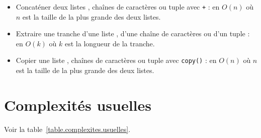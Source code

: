 \begin{itemize}
  \item[\textbullet] Concaténer deux listes \python, chaînes de caractères ou tuple avec \texttt{+} : en $O(n)$ où $n$ est la taille de la plus grande des deux listes.
  \item[\textbullet] Extraire une tranche d'une liste \python, d'une chaîne de caractères ou d'un tuple : en $O(k)$ où $k$ est la longueur de la tranche.
  \item[\textbullet] Copier une liste \python, chaînes de caractères ou tuple avec \texttt{copy()} : en $O(n)$ où $n$ est la taille de la plus grande des deux listes.
\end{itemize}

\section{Complexités usuelles}
Voir la table~\ref{table.complexites.usuelles}.
